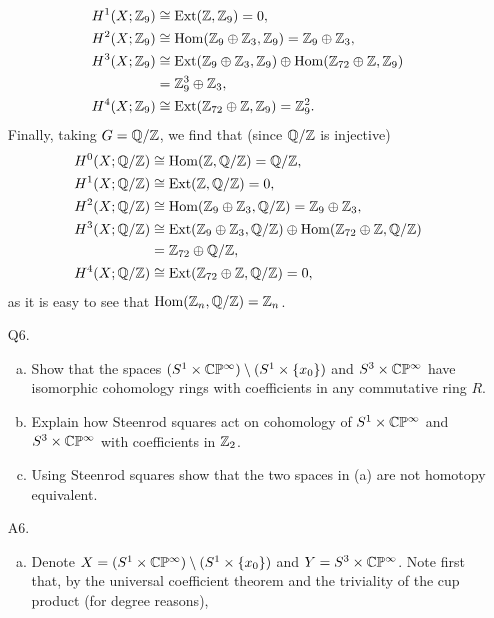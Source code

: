 \documentclass{../mathnotes}
\begin{document}
\begin{enumerate}
\begin{align*}
            H^1(X;\mathbb{Z}_9) &\cong\operatorname{Ext}(\mathbb{Z},\mathbb{Z}_9)=0,\\
            H^2(X;\mathbb{Z}_9) &\cong\operatorname{Hom}(\mathbb{Z}_9\oplus\mathbb{Z}_3,\mathbb{Z}_9)=\mathbb{Z}_9\oplus\mathbb{Z}_3,\\
            H^3(X;\mathbb{Z}_9) &\cong\operatorname{Ext}(\mathbb{Z}_9\oplus\mathbb{Z}_3,\mathbb{Z}_9)\oplus\operatorname{Hom}(\mathbb{Z}_{72}\oplus\mathbb{Z},\mathbb{Z}_9)\\
            &=\mathbb{Z}_9^3\oplus\mathbb{Z}_3,\\
            H^4(X;\mathbb{Z}_9) &\cong\operatorname{Ext}(\mathbb{Z}_{72}\oplus\mathbb{Z},\mathbb{Z}_9)=\mathbb{Z}_9^2.
        \end{align*}
        Finally, taking $G=\mathbb{Q}/\mathbb{Z}$, we find that (since $\mathbb{Q}/\mathbb{Z}$ is injective)
        \begin{align*}
            H^0(X;\mathbb{Q}/\mathbb{Z}) &\cong\operatorname{Hom}(\mathbb{Z},\mathbb{Q}/\mathbb{Z})=\mathbb{Q}/\mathbb{Z},\\
            H^1(X;\mathbb{Q}/\mathbb{Z}) &\cong\operatorname{Ext}(\mathbb{Z},\mathbb{Q}/\mathbb{Z})=0,\\
            H^2(X;\mathbb{Q}/\mathbb{Z}) &\cong\operatorname{Hom}(\mathbb{Z}_9\oplus\mathbb{Z}_3,\mathbb{Q}/\mathbb{Z})=\mathbb{Z}_9\oplus\mathbb{Z}_3,\\
            H^3(X;\mathbb{Q}/\mathbb{Z}) &\cong\operatorname{Ext}(\mathbb{Z}_9\oplus\mathbb{Z}_3,\mathbb{Q}/\mathbb{Z})\oplus\operatorname{Hom}(\mathbb{Z}_{72}\oplus\mathbb{Z},\mathbb{Q}/\mathbb{Z})\\
            &=\mathbb{Z}_{72}\oplus\mathbb{Q}/\mathbb{Z},\\
            H^4(X;\mathbb{Q}/\mathbb{Z}) &\cong\operatorname{Ext}(\mathbb{Z}_{72}\oplus\mathbb{Z},\mathbb{Q}/\mathbb{Z})=0,
        \end{align*}
        as it is easy to see that $\operatorname{Hom}(\mathbb{Z}_n,\mathbb{Q}/\mathbb{Z})=\mathbb{Z}_n$.
        \newpage
    \item[Q6.] 
        \begin{enumerate}[(a)]
            \item Show that the spaces $(S^1\times\mathbb{C}\mathbb{P}^\infty)\setminus(S^1\times\{x_0\})$ and
                $S^3\times\mathbb{C}\mathbb{P}^\infty$ have isomorphic cohomology rings with coefficients in
                any commutative ring $R$.
            \item Explain how Steenrod squares act on cohomology of $S^1\times\mathbb{C}\mathbb{P}^\infty$
                and $S^3\times\mathbb{C}\mathbb{P}^\infty$ with coefficients in $\mathbb{Z}_2$.
            \item Using Steenrod squares show that the two spaces in (a) are not
                homotopy equivalent.
        \end{enumerate}
    \item[A6.]
        \begin{enumerate}[(a)]
            \item Denote $X=(S^1\times \mathbb{C}\mathbb{P}^\infty)\setminus(S^1\times\{x_0\})$ and
                $Y=S^3\times\mathbb{C}\mathbb{P}^\infty$. Note first that, by the universal coefficient theorem
                and the triviality of the cup product (for degree reasons),

\end{enumerate}
\end{enumerate}
\end{document}
